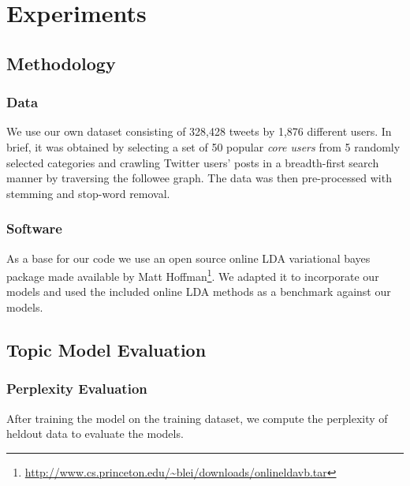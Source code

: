 \section{Experiments}

\subsection{Methodology}\label{sec:methodology}

\subsubsection{Data}\label{sec:data}

We use our own dataset consisting of 328,428 tweets by 1,876 different users. In brief, it was obtained by selecting a set of 50 popular \textit{core users} from 5 randomly selected categories and crawling Twitter users' posts in a breadth-first search manner by traversing the followee graph. The data was then pre-processed with stemming and stop-word removal.

\subsubsection{Software}\label{sec:code}

As a base for our code we use an open source online LDA variational bayes package made available by Matt Hoffman\footnote{\url{http://www.cs.princeton.edu/~blei/downloads/onlineldavb.tar}}. We adapted it to incorporate our models and used the included online LDA methods as a benchmark against our models.


\subsection{Topic Model Evaluation}
\subsubsection{Perplexity Evaluation}



After training the model on the training dataset, we compute the perplexity of heldout data to evaluate the models.

